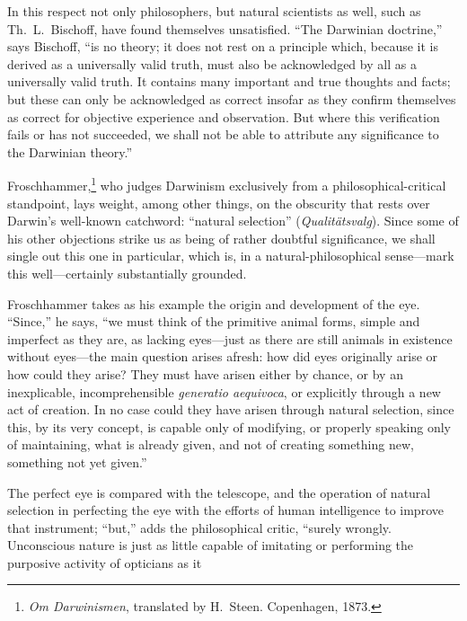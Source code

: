 \documentclass[12pt,a4paper]{article}
\begin{document}
In this respect not only philosophers, but natural scientists as well,
such as Th.\ L.\ Bischoff, have found themselves unsatisfied. ``The
Darwinian doctrine,'' says Bischoff, ``is no theory; it does not rest
on a principle which, because it is derived as a universally valid
truth, must also be acknowledged by all as a universally valid truth.
It contains many important and true thoughts and facts; but these can
only be acknowledged as correct insofar as they confirm themselves as
correct for objective experience and observation. But where this
verification fails or has not succeeded, we shall not be able to
attribute any significance to the Darwinian theory.''

Froschhammer,\footnote{\emph{Om Darwinismen}, translated by H.\
Steen. Copenhagen, 1873.} who judges Darwinism exclusively from a
philosophical-critical standpoint, lays weight, among other things,
on the obscurity that rests over Darwin's well-known catchword:
``natural selection'' (\emph{Qualit\"atsvalg}). Since some of his
other objections strike us as being of rather doubtful significance,
we shall single out this one in particular, which is, in a
natural-philosophical sense---mark this well---certainly substantially
grounded.

Froschhammer takes as his example the origin and development of the
eye. ``Since,'' he says, ``we must think of the primitive animal forms,
simple and imperfect as they are, as lacking eyes---just as there are
still animals in existence without eyes---the main question arises
afresh: how did eyes originally arise or how could they arise? They
must have arisen either by chance, or by an inexplicable,
incomprehensible \emph{generatio aequivoca}, or explicitly through a
new act of creation. In no case could they have arisen through natural
selection, since this, by its very concept, is capable only of
modifying, or properly speaking only of maintaining, what is already
given, and not of creating something new, something not yet given.''

The perfect eye is compared with the telescope, and the operation of
natural selection in perfecting the eye with the efforts of human
intelligence to improve that instrument; ``but,'' adds the
philosophical critic, ``surely wrongly. Unconscious nature is just as
little capable of imitating or performing the purposive activity of
opticians as it
\end{document}
